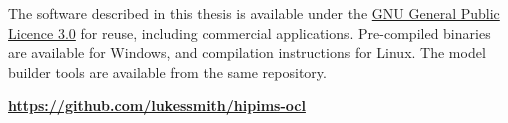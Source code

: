 \begin{software}
The software described in this thesis is available under the \href{https://github.com/lukessmith/hipims-ocl/blob/master/LICENCE}{GNU General Public Licence 3.0} for reuse, including commercial applications. Pre-compiled binaries are available for Windows, and compilation instructions for Linux. The model builder tools are available from the same repository. \\[3ex]

\DeclareRobustCommand{\importantbox}[2][gray!20]{%
	\begin{tcolorbox}[   %
		breakable,
		left=0pt,
		right=0pt,
		top=0pt,
		bottom=0pt,
		colback=#1,
		colframe=#1,
		width=\dimexpr0.9\textwidth\relax, 
		enlarge left by=0mm,
		boxsep=15pt,
		arc=0pt,outer arc=0pt,
		]
		#2
	\end{tcolorbox}
}

\importantbox{\centering
	\href{https://github.com/lukessmith/hipims-ocl}{\textbf{https://github.com/lukessmith/hipims-ocl}}\par
}
\end{software}